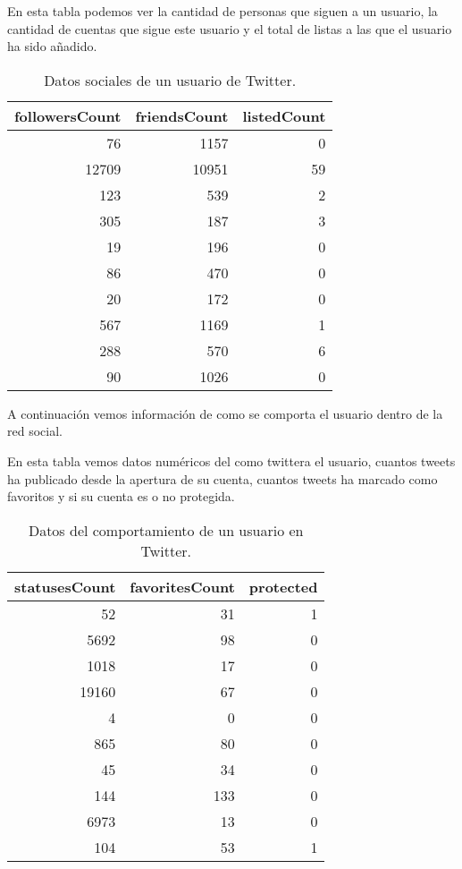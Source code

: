 \documentclass[openright, 12pt, twoside]{report}\usepackage[]{graphicx}\usepackage[]{color}
\begin{document}
En esta tabla podemos ver la cantidad de personas que siguen a un usuario, la cantidad de cuentas que sigue este usuario y el total de listas a las que el usuario ha sido añadido. 

\begin{table}[ht]
\centering
\begin{tabular}{rrr}
  \hline
followersCount & friendsCount & listedCount \\ 
  \hline
76 & 1157 & 0 \\ 
  12709 & 10951 & 59 \\ 
  123 & 539 & 2 \\ 
  305 & 187 & 3 \\ 
  19 & 196 & 0 \\ 
  86 & 470 & 0 \\ 
  20 & 172 & 0 \\ 
  567 & 1169 & 1 \\ 
  288 & 570 & 6 \\ 
  90 & 1026 & 0 \\ 
   \hline
\end{tabular}
\caption{Datos sociales de un usuario de Twitter.} 
\end{table}


A continuación vemos información de como se comporta el usuario dentro de la red social.

En esta tabla vemos datos numéricos del como twittera el usuario, cuantos tweets ha publicado desde la apertura de su cuenta, cuantos tweets ha marcado como favoritos y si su cuenta es o no protegida.

\begin{table}[ht]
\centering
\begin{tabular}{rrr}
  \hline
statusesCount & favoritesCount & protected \\ 
  \hline
52 & 31 & 1 \\ 
  5692 & 98 & 0 \\ 
  1018 & 17 & 0 \\ 
  19160 & 67 & 0 \\ 
  4 & 0 & 0 \\ 
  865 & 80 & 0 \\ 
  45 & 34 & 0 \\ 
  144 & 133 & 0 \\ 
  6973 & 13 & 0 \\ 
  104 & 53 & 1 \\ 
   \hline
\end{tabular}
\caption{Datos del comportamiento de un usuario en Twitter.} 
\end{table}
\end{document}
